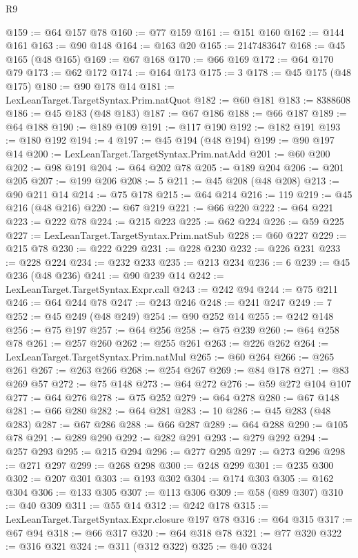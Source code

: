 \begin{lexlean}{R9}
\begin{coremodule}
@159 := @64 @157 @78
@160 := @77 @159
@161 := @151 @160
@162 := @144 @161
@163 := @90 @148
@164 := @163 @20
@165 := 2147483647
@168 := @45 @165 (@48 @165)
@169 := @67 @168
@170 := @66 @169
@172 := @64 @170 @79
@173 := @62 @172
@174 := @164 @173
@175 := 3
@178 := @45 @175 (@48 @175)
@180 := @90 @178 @14
@181 := LexLeanTarget.TargetSyntax.Prim.natQuot
@182 := @60 @181
@183 := 8388608
@186 := @45 @183 (@48 @183)
@187 := @67 @186
@188 := @66 @187
@189 := @64 @188
@190 := @189 @109
@191 := @117 @190
@192 := @182 @191
@193 := @180 @192
@194 := 4
@197 := @45 @194 (@48 @194)
@199 := @90 @197 @14
@200 := LexLeanTarget.TargetSyntax.Prim.natAdd
@201 := @60 @200
@202 := @98 @191
@204 := @64 @202 @78
@205 := @189 @204
@206 := @201 @205
@207 := @199 @206
@208 := 5
@211 := @45 @208 (@48 @208)
@213 := @90 @211 @14
@214 := @75 @178
@215 := @64 @214
@216 := 119
@219 := @45 @216 (@48 @216)
@220 := @67 @219
@221 := @66 @220
@222 := @64 @221
@223 := @222 @78
@224 := @215 @223
@225 := @62 @224
@226 := @59 @225
@227 := LexLeanTarget.TargetSyntax.Prim.natSub
@228 := @60 @227
@229 := @215 @78
@230 := @222 @229
@231 := @228 @230
@232 := @226 @231
@233 := @228 @224
@234 := @232 @233
@235 := @213 @234
@236 := 6
@239 := @45 @236 (@48 @236)
@241 := @90 @239 @14
@242 := LexLeanTarget.TargetSyntax.Expr.call
@243 := @242 @94
@244 := @75 @211
@246 := @64 @244 @78
@247 := @243 @246
@248 := @241 @247
@249 := 7
@252 := @45 @249 (@48 @249)
@254 := @90 @252 @14
@255 := @242 @148
@256 := @75 @197
@257 := @64 @256
@258 := @75 @239
@260 := @64 @258 @78
@261 := @257 @260
@262 := @255 @261
@263 := @226 @262
@264 := LexLeanTarget.TargetSyntax.Prim.natMul
@265 := @60 @264
@266 := @265 @261
@267 := @263 @266
@268 := @254 @267
@269 := @84 @178
@271 := @83 @269 @57
@272 := @75 @148
@273 := @64 @272
@276 := @59 @272 @104 @107
@277 := @64 @276
@278 := @75 @252
@279 := @64 @278
@280 := @67 @148
@281 := @66 @280
@282 := @64 @281
@283 := 10
@286 := @45 @283 (@48 @283)
@287 := @67 @286
@288 := @66 @287
@289 := @64 @288
@290 := @105 @78
@291 := @289 @290
@292 := @282 @291
@293 := @279 @292
@294 := @257 @293
@295 := @215 @294
@296 := @277 @295
@297 := @273 @296
@298 := @271 @297
@299 := @268 @298
@300 := @248 @299
@301 := @235 @300
@302 := @207 @301
@303 := @193 @302
@304 := @174 @303
@305 := @162 @304
@306 := @133 @305
@307 := @113 @306
@309 := @58 (@89 @307)
@310 := @40 @309
@311 := @55 @14
@312 := @242 @178
@315 := LexLeanTarget.TargetSyntax.Expr.closure @197 @78
@316 := @64 @315
@317 := @67 @94
@318 := @66 @317
@320 := @64 @318 @78
@321 := @77 @320
@322 := @316 @321
@324 := @311 (@312 @322)
@325 := @40 @324

\end{coremodule}
\end{lexlean}
